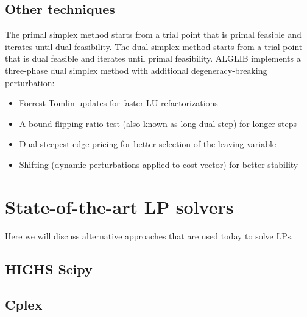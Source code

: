 \subsection{Other techniques}
The primal simplex method starts from a trial point that is primal feasible and iterates until dual feasibility.
The dual simplex method starts from a trial point that is dual feasible and iterates until primal feasibility.
ALGLIB implements a three-phase dual simplex method with additional degeneracy-breaking perturbation:
\begin{itemize}
    \item Forrest-Tomlin updates for faster LU refactorizations
    \item A bound flipping ratio test (also known as long dual step) for longer steps
    \item Dual steepest edge pricing for better selection of the leaving variable
    \item Shifting (dynamic perturbations applied to cost vector) for better stability
\end{itemize}

\section{State-of-the-art LP solvers}
Here we will discuss alternative approaches that are used today to solve LPs.
\subsection{HIGHS Scipy}
\subsection{Cplex}

